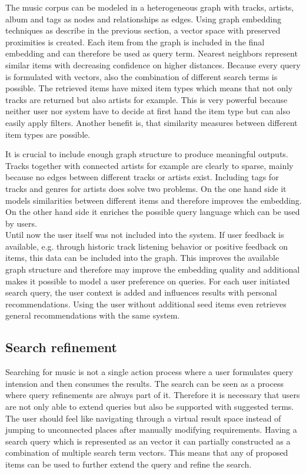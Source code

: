 \documentclass[sigconf]{acmart}
\begin{document}
The music corpus can be modeled in a heterogeneous graph with tracks, artists, album and tags as nodes and relationships as edges. Using graph embedding techniques as describe in the previous section, a vector space with preserved proximities is created. Each item from the graph is included in the final embedding and can therefore be used as query term. Nearest neighbors represent similar items with decreasing confidence on higher distances. Because every query is formulated with vectors, also the combination of different search terms is possible. The retrieved items have mixed item types which means that not only tracks are returned but also artists for example. This is very powerful because neither user nor system have to decide at first hand the item type but can also easily apply filters. Another benefit is, that similarity measures between different item types are possible.

It is crucial to include enough graph structure to produce meaningful outputs. Tracks together with connected artists for example are clearly to sparse, mainly because no edges between different tracks or artists exist. Including tags for tracks and genres for artists does solve two problems. On the one hand side it models similarities between different items and therefore improves the embedding. On the other hand side it enriches the possible query language which can be used by users. \\

Until now the user itself was not included into the system. If user feedback is available, e.g. through historic track listening behavior or positive feedback on items, this data can be included into the graph. This improves the available graph structure and therefore may improve the embedding quality and additional makes it possible to model a user preference on queries. For each user initiated search query, the user context is added and influences results with personal recommendations. Using the user without additional seed items even retrieves general recommendations with the same system.


\subsection{Search refinement}

Searching for music is not a single action process where a user formulates query intension and then consumes the results. The search can be seen as a process where query refinements are always part of it. Therefore it is necessary that users are not only able to extend queries but also be supported with suggested terms. The user should feel like navigating through a virtual result space instead of jumping to unconnected places after manually modifying requirements. Having a search query which is represented as an vector it can partially constructed as a combination of multiple search term vectors. This means that any of proposed items can be used to further extend the query and refine the search.
\end{document}
